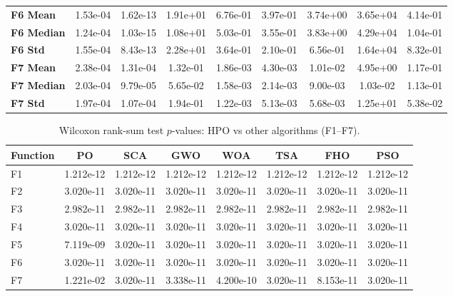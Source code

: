 \documentclass[a4paper,12pt]{article}
\begin{document}
\begin{table}[htbp]
{\begin{tabular}{lcccccccc}
\midrule
\textbf{F6 Mean} & 1.53e-04 & 1.62e-13 & 1.91e+01 & 6.76e-01 & 3.97e-01 & 3.74e+00 & 3.65e+04 & 4.14e-01 \\
\textbf{F6 Median} & 1.24e-04 & 1.03e-15 & 1.08e+01 & 5.03e-01 & 3.55e-01 & 3.83e+00 & 4.29e+04 & 1.04e-01 \\
\textbf{F6 Std} & 1.55e-04 & 8.43e-13 & 2.28e+01 & 3.64e-01 & 2.10e-01 & 6.56e-01 & 1.64e+04 & 8.32e-01 \\
\midrule
\textbf{F7 Mean} & 2.38e-04 & 1.31e-04 & 1.32e-01 & 1.86e-03 & 4.30e-03 & 1.01e-02 & 4.95e+00 & 1.17e-01 \\
\textbf{F7 Median} & 2.03e-04 & 9.79e-05 & 5.65e-02 & 1.58e-03 & 2.14e-03 & 9.00e-03 & 1.03e-02 & 1.13e-01 \\
\textbf{F7 Std} & 1.97e-04 & 1.07e-04 & 1.94e-01 & 1.22e-03 & 5.13e-03 & 5.68e-03 & 1.25e+01 & 5.38e-02 \\
\bottomrule
\end{tabular}}
\label{tab:benchmark_results}
\end{table}

\begin{table}[htbp]
\centering
\caption{Wilcoxon rank-sum test $p$-values: HPO vs other algorithms (F1–F7).}
\label{tab:wilcoxon_pvalues}
\begin{tabular}{lccccccc}
\toprule
Function & PO & SCA & GWO & WOA & TSA & FHO & PSO \\
\midrule
F1 & 1.212e-12 & 1.212e-12 & 1.212e-12 & 1.212e-12 & 1.212e-12 & 1.212e-12 & 1.212e-12 \\
F2 & 3.020e-11 & 3.020e-11 & 3.020e-11 & 3.020e-11 & 3.020e-11 & 3.020e-11 & 3.020e-11 \\
F3 & 2.982e-11 & 2.982e-11 & 2.982e-11 & 2.982e-11 & 2.982e-11 & 2.982e-11 & 2.982e-11 \\
F4 & 3.020e-11 & 3.020e-11 & 3.020e-11 & 3.020e-11 & 3.020e-11 & 3.020e-11 & 3.020e-11 \\
F5 & 7.119e-09 & 3.020e-11 & 3.020e-11 & 3.020e-11 & 3.020e-11 & 3.020e-11 & 3.020e-11 \\
F6 & 3.020e-11 & 3.020e-11 & 3.020e-11 & 3.020e-11 & 3.020e-11 & 3.020e-11 & 3.020e-11 \\
F7 & 1.221e-02 & 3.020e-11 & 3.338e-11 & 4.200e-10 & 3.020e-11 & 8.153e-11 & 3.020e-11 \\
\bottomrule
\end{tabular}
\end{table}
\end{document}
